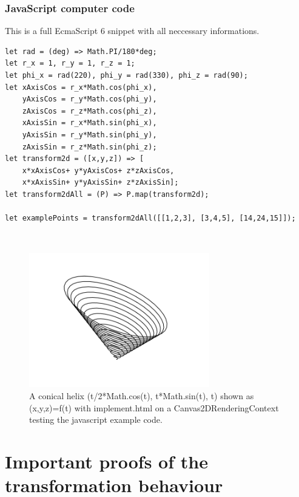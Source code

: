 \documentclass[a4paper]{article}
\begin{document}
\begin{Example}
\subsubsection{JavaScript computer code}
\begin{example}
This is a full EcmaScript 6 snippet with all neccessary informations.\\
\begin{lstlisting}
let rad = (deg) => Math.PI/180*deg;
let r_x = 1, r_y = 1, r_z = 1; 
let phi_x = rad(220), phi_y = rad(330), phi_z = rad(90); 
let xAxisCos = r_x*Math.cos(phi_x), 
    yAxisCos = r_y*Math.cos(phi_y),
    zAxisCos = r_z*Math.cos(phi_z),
    xAxisSin = r_x*Math.sin(phi_x), 
    yAxisSin = r_y*Math.sin(phi_y),
    zAxisSin = r_z*Math.sin(phi_z);
let transform2d = ([x,y,z]) => [
    x*xAxisCos+ y*yAxisCos+ z*zAxisCos,
    x*xAxisSin+ y*yAxisSin+ z*zAxisSin];
let transform2dAll = (P) => P.map(transform2d);

let examplePoints = transform2dAll([[1,2,3], [3,4,5], [14,24,15]]);
\end{lstlisting}
\end{example}\\

\begin{figure}[ht]
\includegraphics[scale=0.5]{conicalhelix.png}
\caption{A conical helix (t/2*Math.cos(t), t*Math.sin(t), t) shown as (x,y,z)=f(t) with implement.html on a Canvas2DRenderingContext testing the javascript example code.}
\end{figure}

\section{Important proofs of the transformation behaviour}
\label{important_proofs}


\end{Example}
\end{document}
